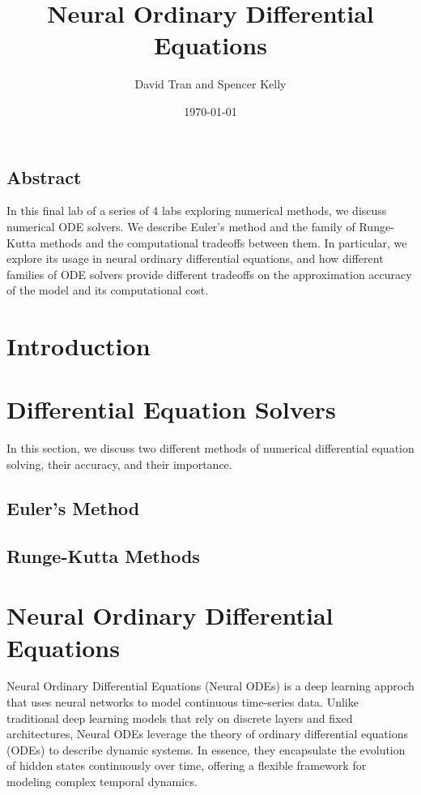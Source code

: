 \documentclass[11pt]{article}
\title{Neural Ordinary Differential Equations}
\author{David Tran and Spencer Kelly}
\date{\today}
\begin{document}
\maketitle

\subsection*{Abstract}

In this final lab of a series of 4 labs exploring numerical methods, we discuss numerical ODE solvers. We describe Euler's method and the family of Runge-Kutta methods and the computational tradeoffs between them. In particular, we explore its usage in neural ordinary differential equations, and how different families of ODE solvers provide different tradeoffs on the approximation accuracy of the model and its computational cost.

\section{Introduction}

\section{Differential Equation Solvers}

In this section, we discuss two different methods of numerical differential equation solving, their accuracy, and their importance.

\subsection{Euler's Method}

\subsection{Runge-Kutta Methods}

\section{Neural Ordinary Differential Equations}

Neural Ordinary Differential Equations (Neural ODEs) is a deep learning approch that uses neural networks to model continuous time-series data. Unlike traditional deep learning models that rely on discrete layers and fixed architectures, Neural ODEs leverage the theory of ordinary differential equations (ODEs) to describe dynamic systems. In essence, they encapsulate the evolution of hidden states continuously over time, offering a flexible framework for modeling complex temporal dynamics.
\end{document}
